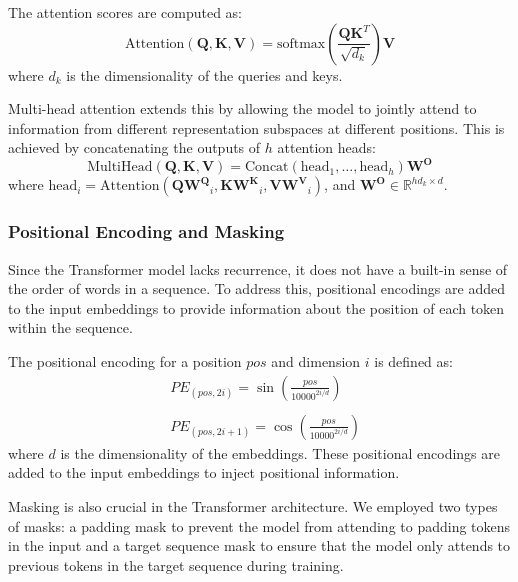 \documentclass[a4papers, 11pt]{article}
\begin{document}
The attention scores are computed as:
\begin{equation}
    \text{Attention}(\mathbf{Q}, \mathbf{K}, \mathbf{V}) = \text{softmax}\left(\frac{\mathbf{Q}\mathbf{K}^T}{\sqrt{d_k}}\right)\mathbf{V}
\end{equation}
where \(d_k\) is the dimensionality of the queries and keys.

Multi-head attention extends this by allowing the model to jointly attend to information from different representation subspaces at different positions. This is achieved by concatenating the outputs of \(h\) attention heads:
\begin{equation}
    \text{MultiHead}(\mathbf{Q}, \mathbf{K}, \mathbf{V}) = \text{Concat}(\text{head}_1, \ldots, \text{head}_h)\mathbf{W^O}
\end{equation}
where \(\text{head}_i = \text{Attention}(\mathbf{Q}\mathbf{W^Q}_i, \mathbf{K}\mathbf{W^K}_i, \mathbf{V}\mathbf{W^V}_i)\), and \(\mathbf{W^O} \in \mathbb{R}^{hd_k \times d}\).

\subsubsection{Positional Encoding and Masking}

Since the Transformer model lacks recurrence, it does not have a built-in sense of the order of words in a sequence. To address this, positional encodings are added to the input embeddings to provide information about the position of each token within the sequence.

The positional encoding for a position \(pos\) and dimension \(i\) is defined as:
\begin{equation}
    \begin{split}
        &PE_{(pos, 2i)} = \sin\left(\frac{pos}{10000^{2i/d}}\right)
        \\\\
        &PE_{(pos, 2i+1)} = \cos\left(\frac{pos}{10000^{2i/d}}\right)
    \end{split}    
\end{equation}
where \(d\) is the dimensionality of the embeddings. These positional encodings are added to the input embeddings to inject positional information.

Masking is also crucial in the Transformer architecture. We employed two types of masks: a padding mask to prevent the model from attending to padding tokens in the input and a target sequence mask to ensure that the model only attends to previous tokens in the target sequence during training.
\end{document}
